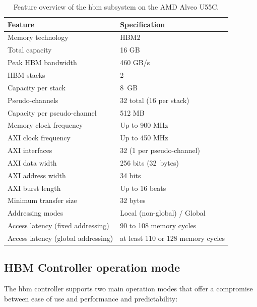 \begin{table}
    \centering
    \begin{tabular}{ll}
        \hline
        \textbf{Feature} & \textbf{Specification} \\
        \hline
        Memory technology       & HBM2 \\
        Total capacity          & 16 GB \\
        Peak HBM bandwidth      & 460 GB/s \\
        HBM stacks              & 2 \\
        Capacity per stack      & 8~GB \\
        Pseudo-channels         & 32 total (16 per stack) \\
        Capacity per pseudo-channel & 512 MB \\
        Memory clock frequency  & Up to 900 MHz \\
        AXI clock frequency     & Up to 450 MHz \\
        AXI interfaces          & 32 (1 per pseudo-channel) \\
        AXI data width          & 256 bits (32~bytes) \\
        AXI address width       & 34 bits \\
        AXI burst length        & Up to 16 beats \\
        Minimum transfer size   & 32 bytes \\
        Addressing modes        & Local (non-global) / Global \\
        Access latency (fixed addressing) & 90 to 108 memory cycles \\
        Access latency (global addressing) & at least 110 or 128 memory cycles \\
        \hline
    \end{tabular}
    \caption{Feature overview of the \gls{hbm} subsystem on the AMD Alveo U55C.}
    \label{tab:u55c_hbm_overview}
\end{table}

\subsection{HBM Controller operation mode}

The \gls{hbm} controller supports two main operation modes that offer a compromise between ease of use and performance and predictability:

